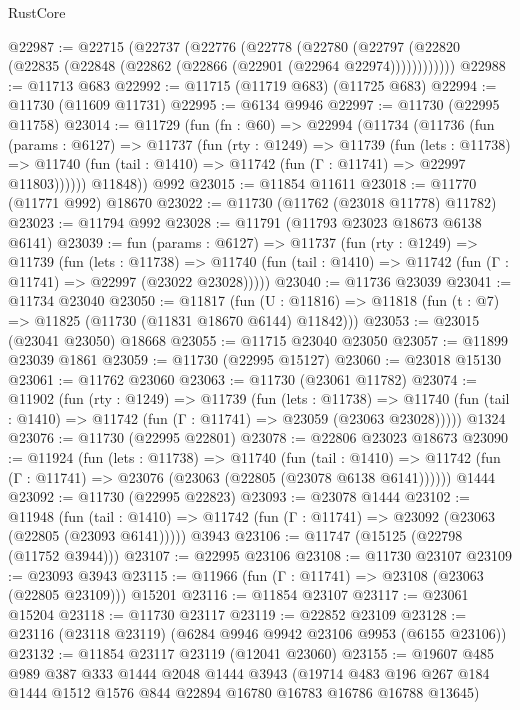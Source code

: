 \begin{lexlean}{RustCore}
\begin{coremodule}
@22987 := @22715
    (@22737
      (@22776
        (@22778
          (@22780 (@22797 (@22820 (@22835 (@22848 (@22862 (@22866 (@22901 (@22964 @22974))))))))))))
@22988 := @11713 @683
@22992 := @11715 (@11719 @683) (@11725 @683)
@22994 := @11730 (@11609 @11731)
@22995 := @6134 @9946
@22997 := @11730 (@22995 @11758)
@23014 := @11729
    (fun (fn : @60) =>
    @22994
      (@11734
        (@11736
          (fun (params : @6127) =>
          @11737
            (fun (rty : @1249) =>
            @11739
              (fun (lets : @11738) =>
              @11740 (fun (tail : @1410) => @11742 (fun (Γ : @11741) => @22997 @11803))))))
        @11848))
    @992
@23015 := @11854 @11611
@23018 := @11770 (@11771 @992) @18670
@23022 := @11730 (@11762 (@23018 @11778) @11782)
@23023 := @11794 @992
@23028 := @11791 (@11793 @23023 @18673 @6138 @6141)
@23039 := fun (params : @6127) =>
  @11737
    (fun (rty : @1249) =>
    @11739
      (fun (lets : @11738) =>
      @11740 (fun (tail : @1410) => @11742 (fun (Γ : @11741) => @22997 (@23022 @23028)))))
@23040 := @11736 @23039
@23041 := @11734 @23040
@23050 := @11817
    (fun (U : @11816) => @11818 (fun (t : @7) => @11825 (@11730 (@11831 @18670 @6144) @11842)))
@23053 := @23015 (@23041 @23050) @18668
@23055 := @11715 @23040 @23050
@23057 := @11899 @23039 @1861
@23059 := @11730 (@22995 @15127)
@23060 := @23018 @15130
@23061 := @11762 @23060
@23063 := @11730 (@23061 @11782)
@23074 := @11902
    (fun (rty : @1249) =>
    @11739
      (fun (lets : @11738) =>
      @11740 (fun (tail : @1410) => @11742 (fun (Γ : @11741) => @23059 (@23063 @23028)))))
    @1324
@23076 := @11730 (@22995 @22801)
@23078 := @22806 @23023 @18673
@23090 := @11924
    (fun (lets : @11738) =>
    @11740
      (fun (tail : @1410) =>
      @11742 (fun (Γ : @11741) => @23076 (@23063 (@22805 (@23078 @6138 @6141))))))
    @1444
@23092 := @11730 (@22995 @22823)
@23093 := @23078 @1444
@23102 := @11948
    (fun (tail : @1410) => @11742 (fun (Γ : @11741) => @23092 (@23063 (@22805 (@23093 @6141)))))
    @3943
@23106 := @11747 (@15125 (@22798 (@11752 @3944)))
@23107 := @22995 @23106
@23108 := @11730 @23107
@23109 := @23093 @3943
@23115 := @11966 (fun (Γ : @11741) => @23108 (@23063 (@22805 @23109))) @15201
@23116 := @11854 @23107
@23117 := @23061 @15204
@23118 := @11730 @23117
@23119 := @22852 @23109
@23128 := @23116 (@23118 @23119) (@6284 @9946 @9942 @23106 @9953 (@6155 @23106))
@23132 := @11854 @23117 @23119 (@12041 @23060)
@23155 := @19607
    @485
    @989
    @387
    @333
    @1444
    @2048
    @1444
    @3943
    (@19714 @483 @196 @267 @184 @1444 @1512 @1576 @844 @22894 @16780 @16783 @16786 @16788 @13645)

\end{coremodule}
\end{lexlean}

